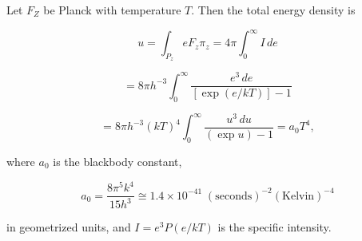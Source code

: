 Let $F_Z$ be Planck with temperature $T$. Then the total energy density is

$$u = \int_{P_z} eF_z \pi_z = 4\pi \int_0^\infty I \, de$$

$$= 8\pi h^{-3} \int_0^\infty \frac{e^3 \, de}{[\exp(e/kT)] - 1}$$

$$= 8\pi h^{-3}(kT)^4 \int_0^\infty \frac{u^3 \, du}{(\exp u) - 1} = a_0 T^4,$$

where $a_0$ is the blackbody constant,

$$a_0 = \frac{8\pi^5 k^4}{15h^3} \cong 1.4 \times 10^{-41} \; (\text{seconds})^{-2} (\text{Kelvin})^{-4}$$

in geometrized units, and $I = e^3 P(e/kT)$ is the specific intensity.
